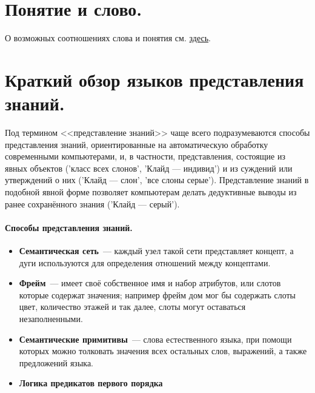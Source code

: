 \documentclass[12pt]{article}
\theoremstyle{definition}
\theoremstyle{remark}
\numberwithin{equation}{section}
\begin{document}
\section{Понятие и слово.}
О возможных соотношениях слова и понятия см. \hyperref[subsec:Concept]{здесь}.

\section{Краткий обзор языков представления знаний.}
Под термином <<представление знаний>> чаще всего подразумеваются способы представления знаний, ориентированные на автоматическую обработку современными компьютерами, и, в частности, представления, состоящие из явных объектов ('класс всех слонов', 'Клайд — индивид') и из суждений или утверждений о них ('Клайд — слон', 'все слоны серые'). Представление знаний в подобной явной форме позволяет компьютерам делать дедуктивные выводы из ранее сохранённого знания ('Клайд — серый').

\paragraph{Способы представления знаний.}
\begin{itemize}
\item \textbf{Семантическая сеть}~--- каждый узел такой сети представляет концепт, а дуги используются для определения отношений между концептами.
\item \textbf{Фрейм}~--- имеет своё собственное имя и набор атрибутов, или слотов которые содержат значения; например фрейм дом мог бы содержать слоты цвет, количество этажей и так далее, слоты могут оставаться незаполненными.
\item \textbf{Семантические примитивы}~--- слова естественного языка, при помощи которых можно толковать значения всех остальных слов, выражений, а также предложений языка.
\item \textbf{Логика предикатов первого порядка}
\end{itemize}
\end{document}
